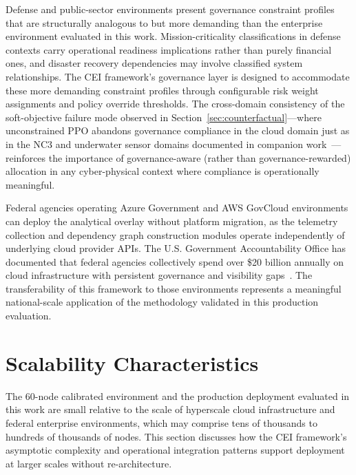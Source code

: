 \documentclass[runningheads]{llncs}
\begin{document}
Defense and public-sector environments present governance constraint profiles that are structurally analogous to but more demanding than the enterprise environment evaluated in this work. Mission-criticality classifications in defense contexts carry operational readiness implications rather than purely financial ones, and disaster recovery dependencies may involve classified system relationships. The CEI framework's governance layer is designed to accommodate these more demanding constraint profiles through configurable risk weight assignments and policy override thresholds. The cross-domain consistency of the soft-objective failure mode observed in Section~\ref{sec:counterfactual}---where unconstrained PPO abandons governance compliance in the cloud domain just as in the NC3 and underwater sensor domains documented in companion work~\cite{paper1,paper2}---reinforces the importance of governance-aware (rather than governance-rewarded) allocation in any cyber-physical context where compliance is operationally meaningful.

Federal agencies operating Azure Government and AWS GovCloud environments can deploy the analytical overlay without platform migration, as the telemetry collection and dependency graph construction modules operate independently of underlying cloud provider APIs. The U.S. Government Accountability Office has documented that federal agencies collectively spend over \$20 billion annually on cloud infrastructure with persistent governance and visibility gaps~\cite{gao_cloud1,gao_cloud2}. The transferability of this framework to those environments represents a meaningful national-scale application of the methodology validated in this production evaluation.

\section{Scalability Characteristics}
\label{sec:scalability}

The 60-node calibrated environment and the production deployment evaluated in this work are small relative to the scale of hyperscale cloud infrastructure and federal enterprise environments, which may comprise tens of thousands to hundreds of thousands of nodes. This section discusses how the CEI framework's asymptotic complexity and operational integration patterns support deployment at larger scales without re-architecture.
\end{document}
